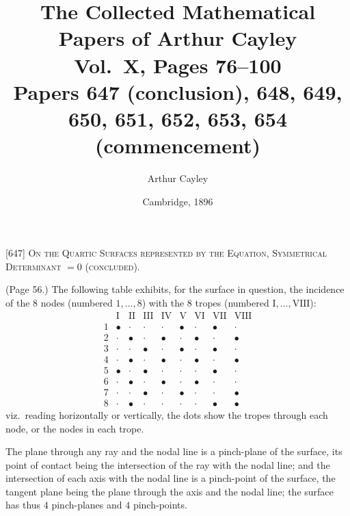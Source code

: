 \documentclass[11pt,a4paper]{article}
\title{The Collected Mathematical Papers of Arthur Cayley\\[6pt]
\large Vol.~X, Pages 76--100 \\[4pt]
\normalsize Papers 647 (conclusion), 648, 649, 650, 651, 652, 653, 654 (commencement)}
\author{Arthur Cayley}
\date{Cambridge, 1896}
\begin{document}
\maketitle
\thispagestyle{fancy}

\setcounter{page}{76}


\begin{center}
\textsc{[647] On the Quartic Surfaces represented by the Equation, Symmetrical Determinant $= 0$ (concluded).}
\end{center}

\medskip

\noindent (Page 56.) The following table exhibits, for the surface in question, the incidence of the $8$ nodes (numbered $1,\ldots,8$) with the $8$ tropes (numbered $\mathrm{I},\ldots,\mathrm{VIII}$):
\[
\begin{array}{c|cccccccc}
 & \mathrm{I} & \mathrm{II} & \mathrm{III} & \mathrm{IV} & \mathrm{V} & \mathrm{VI} & \mathrm{VII} & \mathrm{VIII} \\ \hline
1 & \bullet & \cdot & \cdot & \cdot & \bullet & \cdot & \bullet & \cdot \\
2 & \cdot & \bullet & \cdot & \bullet & \cdot & \bullet & \cdot & \bullet \\
3 & \cdot & \cdot & \bullet & \cdot & \bullet & \cdot & \bullet & \cdot \\
4 & \cdot & \bullet & \cdot & \bullet & \cdot & \bullet & \cdot & \bullet \\
5 & \bullet & \cdot & \bullet & \cdot & \cdot & \cdot & \bullet & \cdot \\
6 & \cdot & \bullet & \cdot & \bullet & \cdot & \bullet & \cdot & \cdot \\
7 & \cdot & \cdot & \bullet & \cdot & \bullet & \cdot & \cdot & \bullet \\
8 & \cdot & \bullet & \cdot & \cdot & \cdot & \cdot & \bullet & \bullet
\end{array}
\]
viz.\ reading horizontally or vertically, the dots show the tropes through each node, or the nodes in each trope.

The plane through any ray and the nodal line is a pinch-plane of the surface, its point of contact being the intersection of the ray with the nodal line; and the intersection of each axis with the nodal line is a pinch-point of the surface, the tangent plane being the plane through the axis and the nodal line; the surface has thus $4$ pinch-planes and $4$ pinch-points.
\end{document}
